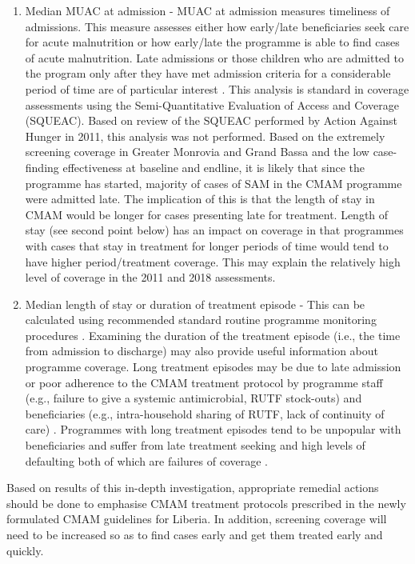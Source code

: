 \documentclass[12pt,a4paper]{article}
\begin{document}
\begin{enumerate}
\def\labelenumi{\arabic{enumi}.}
\item
  Median MUAC at admission - MUAC at admission measures timeliness of admissions. This measure assesses either how early/late beneficiaries seek care for acute malnutrition or how early/late the programme is able to find cases of acute malnutrition. Late admissions or those children who are admitted to the program only after they have met admission criteria for a considerable period of time are of particular interest \citep{Myatt:2012tt}. This analysis is standard in coverage assessments using the Semi-Quantitative Evaluation of Access and Coverage (SQUEAC). Based on review of the SQUEAC performed by Action Against Hunger in 2011, this analysis was not performed. Based on the extremely screening coverage in Greater Monrovia and Grand Bassa and the low case-finding effectiveness at baseline and endline, it is likely that since the programme has started, majority of cases of SAM in the CMAM programme were admitted late. The implication of this is that the length of stay in CMAM would be longer for cases presenting late for treatment. Length of stay (see second point below) has an impact on coverage in that programmes with cases that stay in treatment for longer periods of time would tend to have higher period/treatment coverage. This may explain the relatively high level of coverage in the 2011 and 2018 assessments.
\item
  Median length of stay or duration of treatment episode - This can be calculated using recommended standard routine programme monitoring procedures \citep{ValidInternational:2006vk}. Examining the duration of the treatment episode (i.e., the time from admission to discharge) may also provide useful information about programme coverage. Long treatment episodes may be due to late admission or poor adherence to the CMAM treatment protocol by programme staff (e.g., failure to give a systemic antimicrobial, RUTF stock-outs) and beneficiaries (e.g., intra-household sharing of RUTF, lack of continuity of care) \citep{Myatt:2012tt}. Programmes with long treatment episodes tend to be unpopular with beneficiaries and suffer from late treatment seeking and high levels of defaulting both of which are failures of coverage \citep{Myatt:2012tt}.
\end{enumerate}

Based on results of this in-depth investigation, appropriate remedial actions should be done to emphasise CMAM treatment protocols prescribed in the newly formulated CMAM guidelines for Liberia. In addition, screening coverage will need to be increased so as to find cases early and get them treated early and quickly.
\end{document}
